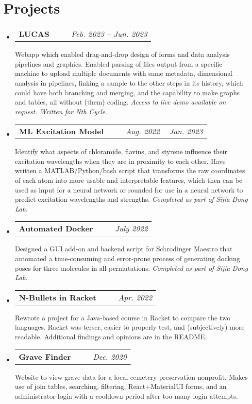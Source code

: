 \documentclass[letterpaper,11pt]{article}
\makeatletter
\newcommand{\resumeSubheading}[5]{
  \vspace{-1pt}\item
    \begin{tabular*}{0.97\textwidth}[t]{c@{\extracolsep{\fill}} r }
      \small\textbf{#1} \headingcap{#3} \ \ \ #2 &  \raggedleft\textit{\small #4} 
    \end{tabular*}
    \small#5
}
\newcommand{\resumeSubHeadingListStart}{\begin{itemize}[leftmargin=*]}
\newcommand{\resumeSubHeadingListEnd}{\end{itemize}}
\makeatother
\begin{document}
  \section{Projects}%
  \resumeSubHeadingListStart \resumeSubheading{LUCAS}{\ghlink{lucas-demo-screenshots}}{ReactTS, MongoDB, Azure, \href{
  https://rjsf-team.github.io/react-jsonschema-form/docs/}{\faIcon{link}RJSF}, \href{
  https://developers.google.com/blockly}{\faIcon{link}Blockly }}{Feb. 2023 --
  Jun. 2023}{Webapp which enabled drag-and-drop design of forms and data analysis pipelines and graphics. Enabled parsing of files output from a specific machine  to upload multiple documents with same metadata, dimensional analysis in pipelines, linking a sample to the other steps in its history, which could have both branching and merging, and the capability to make graphs and tables, all without (them) coding. \textit{Access to live demo available on request. Written for Nth Cycle.}}
  \resumeSubheading{ML Excitation Model}{}{Python, Maestro, MATLAB, Bash,
  TensorFlow}{Aug. 2022 -- Jan. 2023}{Identify what aspects of chloramide,
  flavins, and styrene influence their excitation wavelengths when they are in
  proximity to each other. Have written a MATLAB/Python/bash script that transforms
  the raw coordinates of each atom into more usable and interpretable features,
  which then can be used as input for a neural network or rounded for use in a
  neural network to predict excitation wavelengths and strengths. \textit{Completed as part of Sijia Dong Lab.}}
  \resumeSubheading{Automated Docker}{\ghlink{automated\_docking\_script}}{Python, Schrodinger, Slurm,
  QtPy}{July 2022}{Designed a GUI add-on and backend script for Schrodinger
  Maestro that automated a time-consuming and error-prone process of generating
  docking poses for three molecules in all permutations. \textit{Completed as
  part of Sijia Dong Lab.}}
  \resumeSubheading{N-Bullets in Racket}{\ghlink{nbulletsrkt}}{Intermediate Student Language (Racket subset)}{Apr.
  2022} {Rewrote a project for a Java-based course in Racket to compare the two
  languages. Racket was terser, easier to properly test, and (subjectively) more
  readable. Additional findings and opinions are in the README.}
  \resumeSubheading{Grave Finder}{\ghlink{findagravemiddleborough.ml}}{ReactJS,
  PHP, MySQL, Cloudflare, cPanel, SSL}{Dec. 2020}{Website to view grave data for
  a local cemetery preservation nonprofit. Makes use of join tables, searching,
  filtering, React+MaterialUI forms, and an administrator login with a cooldown
  period after too many login attempts. } \resumeSubHeadingListEnd
\end{document}
